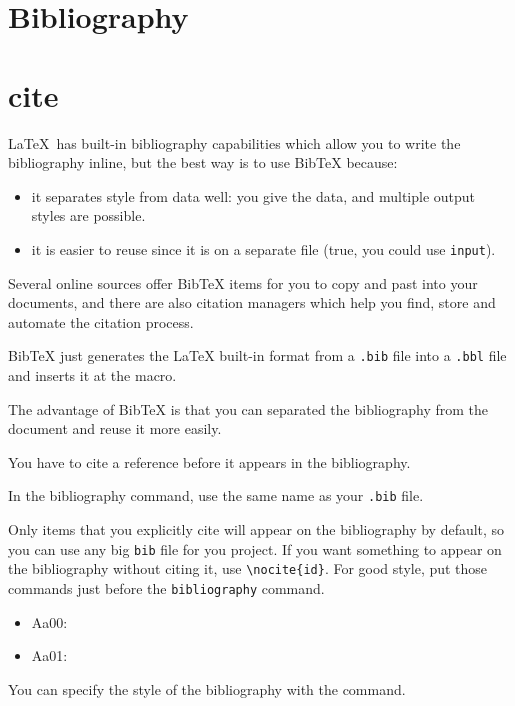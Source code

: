 \documentclass[12pt]{article}
\begin{document}
\section{Bibliography}

\section{cite}\label{cite}

  \LaTeX\ has built-in bibliography capabilities which allow you to write the bibliography inline, but the best way is to use BibTeX because:

  \begin{itemize}
    \item it separates style from data well: you give the data, and multiple output styles are possible.
    \item it is easier to reuse since it is on a separate file (true, you could use \lstinline|input|).
  \end{itemize}

  Several online sources offer BibTeX items for you to copy and past into your documents, and there are also citation managers which help you find, store and automate the citation process.

  BibTeX just generates the LaTeX built-in format from a \lstinline|.bib| file into a \lstinline|.bbl| file and inserts it at the \lstinline|| macro.

  The advantage of BibTeX is that you can separated the bibliography from the document and reuse it more easily.

  You have to cite a reference before it appears in the bibliography.

  In the bibliography command, use the same name as your \lstinline|.bib| file.

  Only items that you explicitly cite will appear on the bibliography by default, so you can use any big \lstinline|bib| file for you project. If you want something to appear on the bibliography without citing it, use \lstinline|\nocite{id}|. For good style, put those commands just before the \lstinline|bibliography| command.

  \begin{itemize}
    \item Aa00: \cite{Aa00}
    \item Aa01: \cite{Aa01}
  \end{itemize}

  You can specify the style of the bibliography with the \lstinline||  command.
\end{document}
